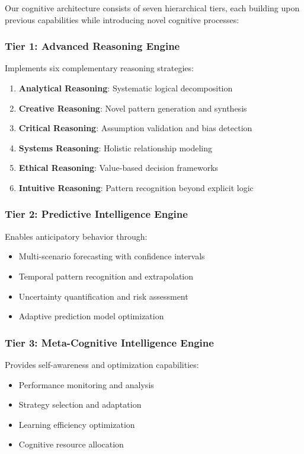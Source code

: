 \documentclass{article}
\begin{document}
Our cognitive architecture consists of seven hierarchical tiers, each building upon previous capabilities while introducing novel cognitive processes:

\subsubsection{Tier 1: Advanced Reasoning Engine}

Implements six complementary reasoning strategies:
\begin{enumerate}
    \item \textbf{Analytical Reasoning}: Systematic logical decomposition
    \item \textbf{Creative Reasoning}: Novel pattern generation and synthesis  
    \item \textbf{Critical Reasoning}: Assumption validation and bias detection
    \item \textbf{Systems Reasoning}: Holistic relationship modeling
    \item \textbf{Ethical Reasoning}: Value-based decision frameworks
    \item \textbf{Intuitive Reasoning}: Pattern recognition beyond explicit logic
\end{enumerate}

\subsubsection{Tier 2: Predictive Intelligence Engine}

Enables anticipatory behavior through:
\begin{itemize}
    \item Multi-scenario forecasting with confidence intervals
    \item Temporal pattern recognition and extrapolation
    \item Uncertainty quantification and risk assessment
    \item Adaptive prediction model optimization
\end{itemize}

\subsubsection{Tier 3: Meta-Cognitive Intelligence Engine}

Provides self-awareness and optimization capabilities:
\begin{itemize}
    \item Performance monitoring and analysis
    \item Strategy selection and adaptation  
    \item Learning efficiency optimization
    \item Cognitive resource allocation
\end{itemize}
\end{document}
